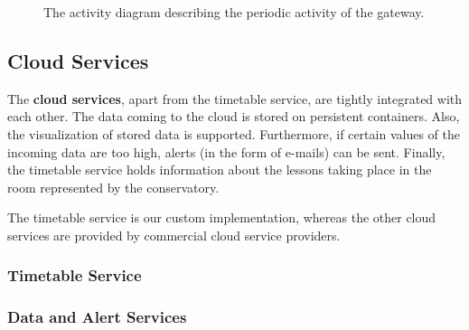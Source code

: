 \documentclass[a4paper, 11pt]{article}
\begin{document}
	\begin{figure}[h!]
		\center
		\caption{The activity diagram describing the periodic activity of the gateway.}
		\label{fig:activity}
	\end{figure}
	
	\subsection{Cloud Services}
	The \textbf{cloud services}, apart from the timetable service, are tightly integrated with each other. The data coming to the cloud is stored on persistent containers. Also, the visualization of stored data is supported. Furthermore, if certain values of the incoming data are too high, alerts (in the form of e-mails) can be sent. Finally, the timetable service holds information about the lessons taking place in the room represented by the conservatory.
	
	The timetable service is our custom implementation, whereas the other cloud services are provided by commercial cloud service providers.
	
	\subsubsection{Timetable Service}
	
	\subsubsection{Data and Alert Services}
	
\end{document}
